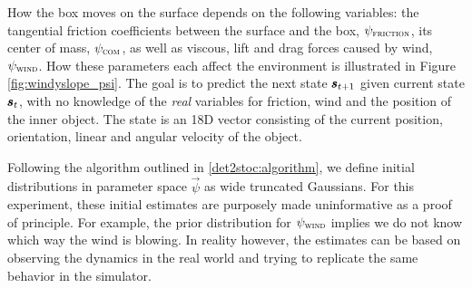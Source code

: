 How the box moves on the surface depends on the following variables: the tangential friction coefficients between the surface and the box, $\psi_{\textsc{friction}}$, its center of mass, $\psi_{\textsc{com}}$, as well as viscous, lift and drag forces caused by wind, $\psi_{\textsc{wind}}$. How these parameters each affect the environment is illustrated in Figure \ref{fig:windyslope_psi}. The goal is to predict the next state $\pmb{s}_{t+1}$ given current state $\pmb{s}_t$, with no knowledge of the \textit{real} variables for friction, wind and the position of the inner object. The state is an 18D vector consisting of the current position, orientation, linear and angular velocity of the object.

Following the \dettostoc{} algorithm outlined in \ref{det2stoc:algorithm}, we define initial distributions in parameter space $\vec{\psi}$ as wide truncated Gaussians. For this experiment, these initial estimates are purposely made uninformative as a proof of principle. For example, the prior distribution for $\psi_{\textsc{wind}}$ implies we do not know which way the wind is blowing. In reality however, the estimates can be based on observing the dynamics in the real world and trying to replicate the same behavior in the simulator.

